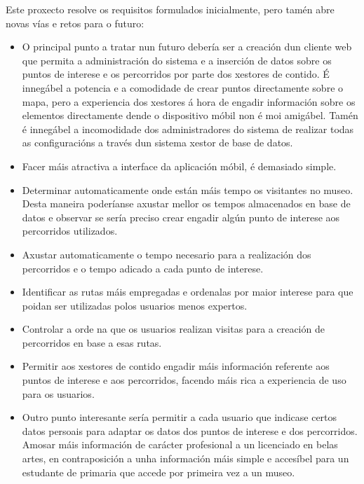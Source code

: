Este proxecto resolve os requisitos formulados inicialmente, pero tamén abre novas vías e retos para o futuro:

\begin{itemize}
	\item O principal punto a tratar nun futuro debería ser a creación dun cliente web que permita a administración do sistema e a inserción de datos sobre os puntos de interese e os percorridos por parte dos xestores de contido. É innegábel a potencia e a comodidade de crear puntos directamente sobre o mapa, pero a experiencia dos xestores á hora de engadir información sobre os elementos directamente dende o dispositivo móbil non é moi amigábel. Tamén é innegábel a incomodidade dos administradores do sistema de realizar todas as configuracións a través dun sistema xestor de base de datos.
	\item Facer máis atractiva a interface da aplicación móbil, é demasiado simple.
	\item Determinar automaticamente onde están máis tempo os visitantes no museo. Desta maneira poderíanse axustar mellor os tempos almacenados en base de datos e observar se sería preciso crear engadir algún punto de interese aos percorridos utilizados.
	\item Axustar automaticamente o tempo necesario para a realización dos percorridos e o tempo adicado a cada punto de interese.
	\item Identificar as rutas máis empregadas e ordenalas por maior interese para que poidan ser utilizadas polos usuarios menos expertos.
	\item Controlar a orde na que os usuarios realizan visitas para a creación de percorridos en base a esas rutas.
	\item Permitir aos xestores de contido engadir máis información referente aos puntos de interese e aos percorridos, facendo máis rica a experiencia de uso para os usuarios.
	\item Outro punto interesante sería permitir a cada usuario que indicase certos datos persoais para adaptar os datos dos puntos de interese e dos percorridos. Amosar máis información de carácter profesional a un licenciado en belas artes, en contraposición a unha información máis simple e accesíbel para un estudante de primaria que accede por primeira vez a un museo.
\end{itemize}
